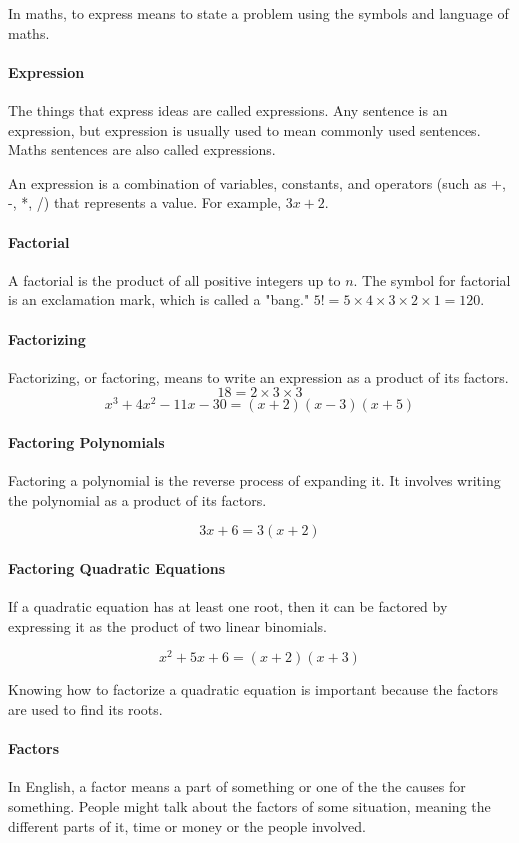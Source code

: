 \documentclass[12pt]{article}
\begin{document}
In maths, to express means to state a problem using the symbols and language of maths.

\paragraph{Expression}
The things that express ideas are called expressions. Any sentence is an expression, but expression is usually used to mean commonly used sentences. Maths sentences are also called expressions.

An expression is a combination of variables, constants, and operators (such as +, -, *, /) that represents a value. For example, \( 3x + 2 \).

\paragraph{Factorial}
A factorial is the product of all positive integers up to \(n\). The symbol for factorial is an exclamation mark, which is called a "bang." \(5!=5\times4\times3\times2\times1=120.\)

\paragraph{Factorizing}
Factorizing, or factoring, means to write an expression as a product of its factors.
$$18=2\times3\times3$$
$$x^3+4x^2−11x−30=(x+2)(x−3)(x+5)$$

\paragraph{Factoring Polynomials}
Factoring a polynomial is the reverse process of expanding it. It involves writing the polynomial as a product of its factors. 

\[3x+6=3(x+2)\]

\paragraph{Factoring Quadratic Equations}
If a quadratic equation has at least one root, then it can be factored by  expressing it as the product of two linear binomials.

\[x^2 + 5x + 6 = (x + 2)(x + 3)\]

Knowing how to factorize a quadratic equation is important because the factors are used to find its roots.

\paragraph{Factors}
In English, a factor means a part of something or one of the the causes for something. People might talk about the factors of some situation, meaning the different parts of it, time or money or the people involved.
\end{document}
